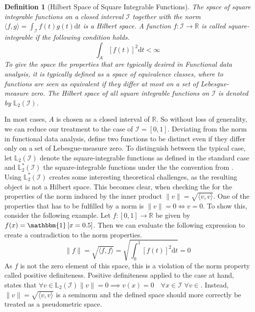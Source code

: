 \documentclass[12pt, a4paper]{article}
\theoremstyle{MAstyle} \newtheorem{assumption}{Assumption}[section]
\theoremstyle{MAstyle} \newtheorem{definition}{Definition}[section]
\begin{document}
			\begin{definition}[Hilbert Space of Square Integrable Functions]
				
				The space of square integrable functions on a closed interval $\mathcal{I}$ together with the norm $\langle f,g\rangle = \int_{\mathcal{I}} f(t)g(t) \mathrm{d}t$ is a Hilbert space.
				A function $f: \mathcal{I} \rightarrow \mathbb{R}$ is called square-integrable if the following condition holds.
				\begin{equation}
					\int_{A} \left[f(t)\right]^2\mathrm{d}t < \infty
				\end{equation}
				To give the space the properties that are typically desired in Functional data analysis, it is typically defined as a space of equivalence classes, where to functions are seen as equivalent if they differ at most on a set of Lebesgue-measure zero. The Hilbert space of all square integrable functions on $\mathcal{I}$ is denoted by $\mathbb{L}_2(\mathcal{I})$.
			\end{definition}
			
			In most cases, $A$ is chosen as a closed interval of $\mathbb{R}$. So without loss of generality, we can reduce our treatment to the case of $\mathcal{I} = [0,1]$.
			Deviating from the norm in functional data analysis, \cite{bugni_permutation_2021} define two functions to be distinct even if they differ only on a set of Lebesgue-measure zero. To distinguish between the typical case, let $\mathbb{L}_2(\mathcal{I})$ denote the square-integrable functions as defined in the standard case and $\mathbb{L}^{*}_2(\mathcal{I})$ the square-integrable functions under the the convention from \cite{bugni_permutation_2021}.\\
			
			Using $\mathbb{L}^{*}_2(\mathcal{I})$ creates some interesting theoretical challenges, as the resulting object is not a Hilbert space. This becomes clear, when checking the for the properties of the norm induced by the inner product $\| v \| = \sqrt{\langle v, v\rangle}$.
			One of the properties that has to be fulfilled by a norm is $\| v \| = 0 \Longleftrightarrow v = 0$.			
			To show this, consider the following example. Let $f:[0,1] \rightarrow \mathbb{R}$ be given by $f(x) = \mathbbm{1}\left[x = 0.5\right]$. Then we can evaluate the following expression to create a contradiction to the norm properties.
			\begin{equation}
				\| f \| = \sqrt{\langle f, f\rangle} = \sqrt{\int_{0}^{1} \left[f(t)\right]^2\mathrm{d}t } = 0
			\end{equation}
			As $f$ is not the zero element of this space, this is a violation of the norm property called positive definiteness. Positive definiteness applied to the case at hand, states that $\forall v \in \mathbb{L}_2\left(\mathcal{I}\right) \| v \| = 0 \implies v(x) = 0 \quad \forall x \in \mathcal{I}$  $\forall v \in $. Instead, $\| v \| = \sqrt{\langle v, v\rangle}$ is a seminorm and the defined space should more correctly be treated as a pseudometric space.\\
			
\end{document}
